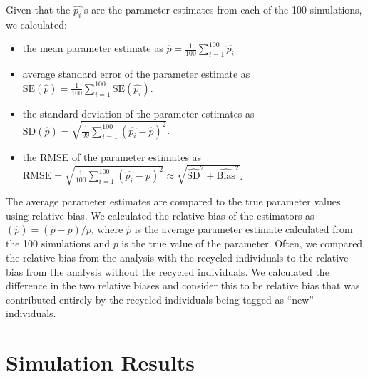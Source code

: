\documentclass[]{article}
\providecommand{\tightlist}{%
  \setlength{\itemsep}{0pt}\setlength{\parskip}{0pt}}
\begin{document}
Given that the \(\hat{p_i}\)'s are the parameter estimates from each of
the 100 simulations, we calculated:

\begin{itemize}
\tightlist
\item
  the mean parameter estimate as
  \(\hat{p}= \frac{1}{100} \sum_{i=1}^{100} \hat{p_i}\)
\item
  average standard error of the parameter estimate as
  \(\text{SE}(\hat{p})= \frac{1}{100} \sum_{i=1}^{100} \text{SE}(\hat{p_i})\).
\item
  the standard deviation of the parameter estimates as
  \(\text{SD}(\hat{p})= \sqrt{\frac{1}{99} \sum_{i=1}^{100} (\hat{p_i}-\hat{p})^2}\).
\item
  the RMSE of the parameter estimates as
  \(\text{RMSE}= \sqrt{\frac{1}{100} \sum_{i=1}^{100} (\hat{p_i}-p)^2} \approx \sqrt{\hat{\text{SD}}^2+\hat{\text{Bias}}^2}\).
\end{itemize}

The average parameter estimates are compared to the true parameter
values using relative bias. We calculated the relative bias of the
estimators as \(\left(\hat{p}\right) =(\hat{p} -p)/p\), where
\(\hat{p}\) is the average parameter estimate calculated from the 100
simulations and \(p\) is the true value of the parameter. Often, we
compared the relative bias from the analysis with the recycled
individuals to the relative bias from the analysis without the recycled
individuals. We calculated the difference in the two relative biases and
consider this to be relative bias that was contributed entirely by the
recycled individuals being tagged as ``new'' individuals.




\section{Simulation Results}\label{results}
\end{document}
